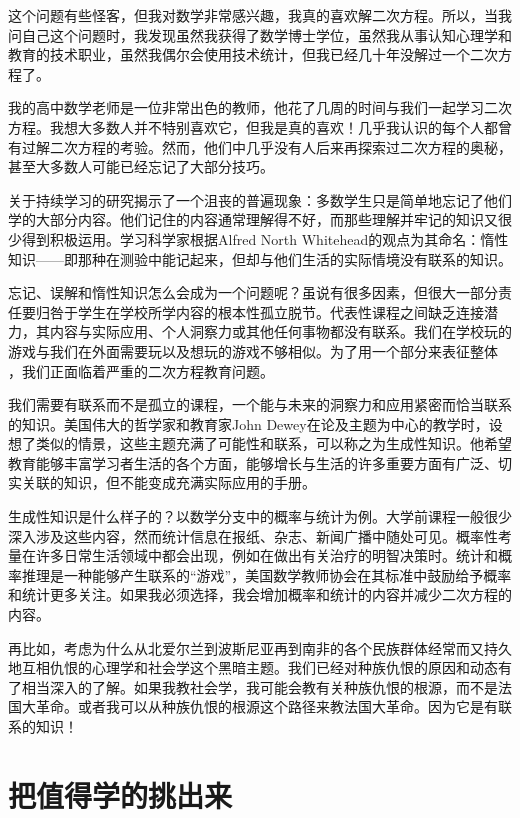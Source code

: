 这个问题有些怪客，但我对数学非常感兴趣，我真的喜欢解二次方程。所以，当我问自己这个问题时，我发现虽然我获得了数学博士学位，虽然我从事认知心理学和教育的技术职业，虽然我偶尔会使用技术统计，但我已经几十年没解过一个二次方程了。

我的高中数学老师是一位非常出色的教师，他花了几周的时间与我们一起学习二次方程。我想大多数人并不特别喜欢它，但我是真的喜欢！几乎我认识的每个人都曾有过解二次方程的考验。然而，他们中几乎没有人后来再探索过二次方程的奥秘，甚至大多数人可能已经忘记了大部分技巧。

关于持续学习的研究揭示了一个沮丧的普遍现象：多数学生只是简单地忘记了他们学的大部分内容。他们记住的内容通常理解得不好，而那些理解并牢记的知识又很少得到积极运用。学习科学家根据Alfred North Whitehead的观点为其命名：惰性知识——即那种在测验中能记起来，但却与他们生活的实际情境没有联系的知识。

忘记、误解和惰性知识怎么会成为一个问题呢？虽说有很多因素，但很大一部分责任要归咎于学生在学校所学内容的根本性孤立脱节。代表性课程之间缺乏连接潜力，其内容与实际应用、个人洞察力或其他任何事物都没有联系。我们在学校玩的游戏与我们在外面需要玩以及想玩的游戏不够相似。为了用一个部分来表征整体 ，我们正面临着严重的二次方程教育问题。

我们需要有联系而不是孤立的课程，一个能与未来的洞察力和应用紧密而恰当联系的知识。美国伟大的哲学家和教育家John Dewey在论及主题为中心的教学时，设想了类似的情景，这些主题充满了可能性和联系，可以称之为生成性知识。他希望教育能够丰富学习者生活的各个方面，能够增长与生活的许多重要方面有广泛、切实关联的知识，但不能变成充满实际应用的手册。

生成性知识是什么样子的？以数学分支中的概率与统计为例。大学前课程一般很少深入涉及这些内容，然而统计信息在报纸、杂志、新闻广播中随处可见。概率性考量在许多日常生活领域中都会出现，例如在做出有关治疗的明智决策时。统计和概率推理是一种能够产生联系的“游戏”，美国数学教师协会在其标准中鼓励给予概率和统计更多关注。如果我必须选择，我会增加概率和统计的内容并减少二次方程的内容。

再比如，考虑为什么从北爱尔兰到波斯尼亚再到南非的各个民族群体经常而又持久地互相仇恨的心理学和社会学这个黑暗主题。我们已经对种族仇恨的原因和动态有了相当深入的了解。如果我教社会学，我可能会教有关种族仇恨的根源，而不是法国大革命。或者我可以从种族仇恨的根源这个路径来教法国大革命。因为它是有联系的知识！

\section*{把值得学的挑出来}

